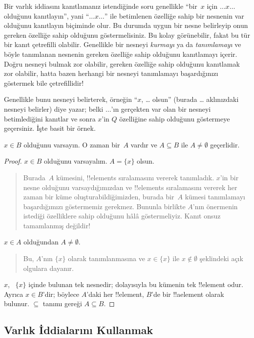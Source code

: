 \documentclass[../../../include/open-logic-section]{subfiles}
\begin{document}
Bir varlık iddiasını kanıtlamanız istendiğinde soru genellikle
``bir~$x$ için $\dots x \dots$ olduğunu kanıtlayın'', yani
``$\dots x \dots$'' ile betimlenen özelliğe sahip bir nesnenin var
olduğunu kanıtlayın biçiminde olur. Bu durumda uygun bir nesne belirleyip
onun gereken özelliğe sahip olduğunu göstermelisiniz. Bu kolay
görünebilir, fakat bu tür bir kanıt çetrefilli olabilir. Genellikle bir
nesneyi \emph{kurmayı} ya da \emph{tanımlamayı} ve böyle tanımlanan
nesnenin gereken özelliğe sahip olduğunu kanıtlamayı içerir. Doğru
nesneyi bulmak zor olabilir, gereken özelliğe sahip olduğunu kanıtlamak
zor olabilir, hatta bazen herhangi bir nesneyi tanımlamayı başardığınızı
göstermek bile çetrefillidir!{}

Genellikle bunu nesneyi belirterek, örneğin ``$x$, \dots{} olsun''
(burada \dots{} aklınızdaki nesneyi belirler) diye yazar; belki
$\dots$'ın gerçekten var olan bir nesneyi betimlediğini kanıtlar ve sonra
$x$'in $Q$ özelliğine sahip olduğunu göstermeye geçersiniz. İşte basit
bir örnek.

\begin{prop}
  $x \in B$ olduğunu varsayın. O zaman bir~$A$ vardır ve $A \subseteq B$
  ile $A \neq \emptyset$ geçerlidir.
\end{prop}

\begin{proof}
  $x \in B$ olduğunu varsayalım. $A = \{x\}$ olsun.
  \begin{quote}
    Burada~$A$ kümesini, !!{element}s sıralamasını vererek tanımladık. $x$'in bir
    nesne olduğunu varsaydığımızdan ve !!{element}s sıralamasını vererek her
    zaman bir küme oluşturabildiğimizden, burada bir~$A$ kümesi
    tanımlamayı başardığımızı göstermemiz gerekmez. Bununla birlikte
    $A$'nın önermenin istediği özelliklere sahip olduğunu hâlâ
    göstermeliyiz. Kanıt onsuz tamamlanmış değildir!{}
  \end{quote}
  $x \in A$ olduğundan $A \neq \emptyset$.
  \begin{quote}
    Bu, $A$'nın $\{x\}$ olarak tanımlanmasına ve $x \in \{x\}$ ile $x
    \notin \emptyset$ şeklindeki açık olgulara dayanır.
  \end{quote}
  $x$, ~$\{x\}$ içinde bulunan tek nesnedir; dolayısıyla bu kümenin tek
  !!{element} odur. Ayrıca $x \in B$'dir; böylece $A$'daki her
  !!{element}, $B$'de bir !!a{element} olarak
  bulunur. $\subseteq$
  tanımı gereği $A \subseteq B$.
\end{proof}

\subsection{Varlık İddialarını Kullanmak}
\end{document}

